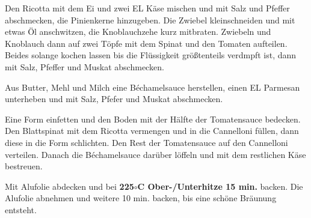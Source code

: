 \vspace*{\fill}
\begin{multicols}{2}
Den Ricotta mit dem Ei und zwei EL Käse mischen und mit Salz und Pfeffer abschmecken, die Pinienkerne hinzugeben.\newline
Die Zwiebel kleinschneiden und mit etwas Öl anschwitzen, die Knoblauchzehe kurz mitbraten. Zwiebeln und Knoblauch dann auf zwei Töpfe mit dem Spinat und den Tomaten aufteilen.\newline
Beides solange kochen lassen bis die Flüssigkeit größtenteils verdmpft ist, dann mit Salz, Pfeffer und Muskat abschmecken.\newline

Aus Butter, Mehl und Milch eine Béchamelsauce herstellen, einen EL Parmesan unterheben und mit Salz, Pfefer und Muskat abschmecken.\newline

Eine Form einfetten und den Boden mit der Hälfte der Tomatensauce bedecken. Den Blattspinat mit dem Ricotta vermengen und in die Cannelloni füllen, dann diese in die Form schlichten. Den Rest der Tomatensauce auf den Cannelloni verteilen. Danach die Béchamelsauce darüber löffeln und mit dem restlichen Käse bestreuen. \newline

Mit Alufolie abdecken und bei\textbf{ 225$\circ$C Ober-/Unterhitze 15 min.} backen. Die Alufolie abnehmen und weitere 10 min. backen, bis eine schöne Bräunung entsteht. 


\end{multicols}
\vfill
